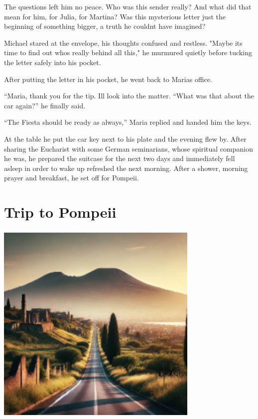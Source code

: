 \documentclass[
]{article}
\begin{document}
The questions left him no peace. Who was this sender really? And what
did that mean for him, for Julia, for Martina? Was this mysterious
letter just the beginning of something bigger, a truth he
couldn\textquotesingle t have imagined?

Michael stared at the envelope, his thoughts confused and restless.
"Maybe it\textquotesingle s time to find out who\textquotesingle s
really behind all this," he murmured quietly before tucking the letter
safely into his pocket.

After putting the letter in his pocket, he went back to
Maria\textquotesingle s office.

``Maria, thank you for the tip. I\textquotesingle ll look into the
matter. ``What was that about the car again?'' he finally said.

``The Fiesta should be ready as always,'' Maria replied and handed him
the keys.

At the table he put the car key next to his plate and the evening flew
by. After sharing the Eucharist with some German seminarians, whose
spiritual companion he was, he prepared the suitcase for the next two
days and immediately fell asleep in order to wake up refreshed the next
morning. After a shower, morning prayer and breakfast, he set off for
Pompeii.

\section{Trip to Pompeii}\label{trip-to-pompeii}

\includegraphics[width=3.83373in,height=3.87746in]{media/image2.png}
\end{document}
